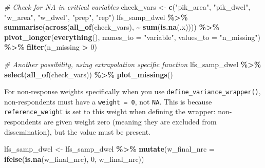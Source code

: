 \documentclass[
]{article}
\newenvironment{Shaded}{\begin{snugshade}}{\end{snugshade}}
\newcommand{\AttributeTok}[1]{\textcolor[rgb]{0.13,0.29,0.53}{#1}}
\newcommand{\CommentTok}[1]{\textcolor[rgb]{0.56,0.35,0.01}{\textit{#1}}}
\newcommand{\DecValTok}[1]{\textcolor[rgb]{0.00,0.00,0.81}{#1}}
\newcommand{\FunctionTok}[1]{\textcolor[rgb]{0.13,0.29,0.53}{\textbf{#1}}}
\newcommand{\NormalTok}[1]{#1}
\newcommand{\OtherTok}[1]{\textcolor[rgb]{0.56,0.35,0.01}{#1}}
\newcommand{\SpecialCharTok}[1]{\textcolor[rgb]{0.81,0.36,0.00}{\textbf{#1}}}
\newcommand{\StringTok}[1]{\textcolor[rgb]{0.31,0.60,0.02}{#1}}
\begin{document}
\begin{Shaded}
\begin{Highlighting}[]
\CommentTok{\# Check for NA in critical variables}
\NormalTok{check\_vars }\OtherTok{\textless{}{-}} \FunctionTok{c}\NormalTok{(}\StringTok{"pik\_area"}\NormalTok{, }\StringTok{"pik\_dwel"}\NormalTok{, }\StringTok{"w\_area"}\NormalTok{, }\StringTok{"w\_dwel"}\NormalTok{, }\StringTok{"prep"}\NormalTok{, }\StringTok{"rep"}\NormalTok{)}
\NormalTok{lfs\_samp\_dwel }\SpecialCharTok{\%\textgreater{}\%}
  \FunctionTok{summarise}\NormalTok{(}\FunctionTok{across}\NormalTok{(}\FunctionTok{all\_of}\NormalTok{(check\_vars), }\SpecialCharTok{\textasciitilde{}} \FunctionTok{sum}\NormalTok{(}\FunctionTok{is.na}\NormalTok{(.x)))) }\SpecialCharTok{\%\textgreater{}\%}
  \FunctionTok{pivot\_longer}\NormalTok{(}\FunctionTok{everything}\NormalTok{(), }\AttributeTok{names\_to =} \StringTok{"variable"}\NormalTok{, }\AttributeTok{values\_to =} \StringTok{"n\_missing"}\NormalTok{) }\SpecialCharTok{\%\textgreater{}\%}
  \FunctionTok{filter}\NormalTok{(n\_missing }\SpecialCharTok{\textgreater{}} \DecValTok{0}\NormalTok{)}

\CommentTok{\# Another possibility, using extrapolation specific function}
\NormalTok{lfs\_samp\_dwel }\SpecialCharTok{\%\textgreater{}\%} 
  \FunctionTok{select}\NormalTok{(}\FunctionTok{all\_of}\NormalTok{(check\_vars)) }\SpecialCharTok{\%\textgreater{}\%} 
  \FunctionTok{plot\_missings}\NormalTok{()}
\end{Highlighting}
\end{Shaded}

For non-response weights specifically when you use
\texttt{define\_variance\_wrapper()}, non-respondents must have a
\texttt{weight\ =\ 0}, not \texttt{NA}. This is because
\texttt{reference\_weight} is set to this weight when defining the
wrapper: non-respondents are given weight zero (meaning they are
excluded from dissemination), but the value must be present.

\begin{Shaded}
\begin{Highlighting}[]
\NormalTok{lfs\_samp\_dwel }\OtherTok{\textless{}{-}}\NormalTok{ lfs\_samp\_dwel }\SpecialCharTok{\%\textgreater{}\%}
  \FunctionTok{mutate}\NormalTok{(}\AttributeTok{w\_final\_nrc =} \FunctionTok{ifelse}\NormalTok{(}\FunctionTok{is.na}\NormalTok{(w\_final\_nrc), }\DecValTok{0}\NormalTok{, w\_final\_nrc))}
\end{Highlighting}
\end{Shaded}
\end{document}
